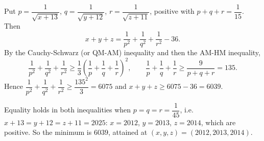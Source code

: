 Put $p=\dfrac{1}{\sqrt{x+13}}$, $q=\dfrac{1}{\sqrt{y+12}}$, $r=\dfrac{1}{\sqrt{z+11}}$, positive with $p+q+r=\dfrac1{15}$. Then
\[x+y+z=\dfrac1{p^2}+\dfrac1{q^2}+\dfrac1{r^2}-36.\]
By the Cauchy-Schwarz (or QM-AM) inequality and then the AM-HM inequality,
\[\dfrac1{p^2}+\dfrac1{q^2}+\dfrac1{r^2}\ge\dfrac13\left(\dfrac1p+\dfrac1q+\dfrac1r\right)^2,\qquad\dfrac1p+\dfrac1q+\dfrac1r\ge\dfrac{9}{p+q+r}=135.\]
Hence $\dfrac1{p^2}+\dfrac1{q^2}+\dfrac1{r^2}\ge\dfrac{135^2}{3}=6075$ and $x+y+z\ge6075-36=6039$.

Equality holds in both inequalities when $p=q=r=\dfrac1{45}$, i.e. $x+13=y+12=z+11=2025$: $x=2012$, $y=2013$, $z=2014$, which are positive. So the minimum is $\boxed{6039}$, attained at $\boxed{(x,y,z)=(2012,2013,2014)}$.
